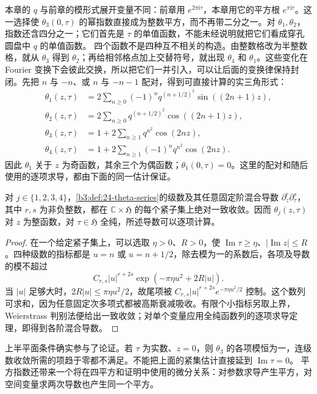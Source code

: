 本章的 \(q\) 与前章的模形式展开变量不同：前章用 \(e^{2\pi\mathrm i\tau}\)，本章用它的平方根 \(e^{\pi\mathrm i\tau}\)。这一选择使 \(\theta_3(0,\tau)\) 的幂指数直接成为整数平方，而不再带二分之一。对 \(\theta_1,\theta_2\)，指数还含四分之一；它们首先是 \(\tau\) 的单值函数，不能未经说明就把它们看成穿孔圆盘中 \(q\) 的单值函数。
\ProseParagraphBreak
四个函数不是四种互不相关的构造。由整数格改为半整数格，就从 \(\theta_3\) 得到 \(\theta_2\)；再给相邻格点加上交替符号，就出现 \(\theta_4\) 和 \(\theta_1\)。这些变化在 Fourier 变换下会彼此交换，所以把它们一并引入，可以让后面的变换律保持封闭。先把 \(n\) 与 \(-n\)、或 \(n\) 与 \(-n-1\) 配对，得到可直接计算的实三角形式：
\[
\begin{aligned}
 \theta_1(z,\tau)&=2\sum_{n\ge0}(-1)^nq^{(n+1/2)^2}
                                      \sin((2n+1)z),\\
 \theta_2(z,\tau)&=2\sum_{n\ge0}q^{(n+1/2)^2}
                                      \cos((2n+1)z),\\
 \theta_3(z,\tau)&=1+2\sum_{n\ge1}q^{n^2}\cos(2nz),\\
 \theta_4(z,\tau)&=1+2\sum_{n\ge1}(-1)^nq^{n^2}\cos(2nz).
\end{aligned}
\]
因此 \(\theta_1\) 关于 \(z\) 为奇函数，其余三个为偶函数；\(\theta_1(0,\tau)=0\)。这里的配对和随后使用的逐项求导，都由下面的同一估计保证。

\begin{proposition}\label{b3:prop:24-theta-normal}
对 \(j\in\{1,2,3,4\}\)，\cref{b3:def:24-theta-series}的级数及其任意固定阶混合导数
\(\partial_z^r\partial_\tau^s\)，其中 \(r,s\) 为非负整数，都在
\(\mathbb C\times\mathfrak H\) 的每个紧子集上绝对一致收敛。因而 \(\theta_j(z,\tau)\) 对 \(z\) 为整函数，对 \(\tau\in\mathfrak H\) 全纯，所述导数可以逐项计算。
\end{proposition}
\begin{proof}
在一个给定紧子集上，可以选取 \(\eta>0\)、\(R>0\)，使
\(\operatorname{Im}\tau\ge\eta\)、\(|\operatorname{Im}z|\le R\)。四种级数的指标都是 \(u=n\) 或 \(u=n+1/2\)，除去模为一的系数后，各项及导数的模不超过
\[
 C_{r,s}|u|^{r+2s}\exp(-\pi\eta u^2+2R|u|).
\]
当 \(|u|\) 足够大时，\(2R|u|\le\pi\eta u^2/2\)，故尾项被
\(C_{r,s}|u|^{r+2s}e^{-\pi\eta u^2/2}\) 控制。这个数列可求和，因为任意固定次多项式都被高斯衰减吸收。有限个小指标另取上界，Weierstrass 判别法便给出一致收敛；对单个变量应用全纯函数列的逐项求导定理，即得到各阶混合导数。
\end{proof}

上半平面条件确实参与了论证。若 \(\tau\) 为实数、\(z=0\)，则 \(\theta_3\) 的各项模恒为一，连级数收敛所需的项趋于零都不满足。不能把上面的紧集估计直接延到 \(\operatorname{Im}\tau=0\)。
\ProseParagraphBreak
平方指数还带来一个将在四平方和证明中使用的微分关系：对参数求导产生平方，对空间变量求两次导数也产生同一个平方。


